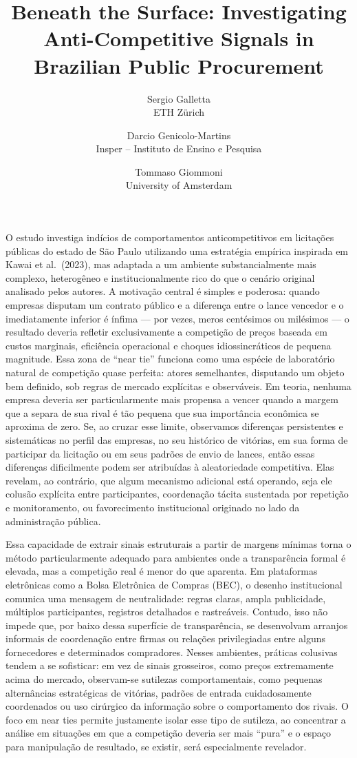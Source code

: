 \documentclass[12pt,a4paper]{article}
\title{Beneath the Surface: Investigating Anti-Competitive Signals in Brazilian Public Procurement}
\author{
  Sergio Galletta\\
  \small ETH Z\"urich
  \and
  Darcio Genicolo-Martins\\
  \small Insper -- Instituto de Ensino e Pesquisa
  \and
  Tommaso Giommoni\\
  \small University of Amsterdam
}
\date{}
\begin{document}
\maketitle

O estudo investiga indícios de comportamentos anticompetitivos em licitações públicas do estado de São Paulo utilizando uma estratégia empírica inspirada em Kawai et al.\ (2023), mas adaptada a um ambiente substancialmente mais complexo, heterogêneo e institucionalmente rico do que o cenário original analisado pelos autores. A motivação central é simples e poderosa: quando empresas disputam um contrato público e a diferença entre o lance vencedor e o imediatamente inferior é ínfima — por vezes, meros centésimos ou milésimos — o resultado deveria refletir exclusivamente a competição de preços baseada em custos marginais, eficiência operacional e choques idiossincráticos de pequena magnitude. Essa zona de ``near tie'' funciona como uma espécie de laboratório natural de competição quase perfeita: atores semelhantes, disputando um objeto bem definido, sob regras de mercado explícitas e observáveis. Em teoria, nenhuma empresa deveria ser particularmente mais propensa a vencer quando a margem que a separa de sua rival é tão pequena que sua importância econômica se aproxima de zero. Se, ao cruzar esse limite, observamos diferenças persistentes e sistemáticas no perfil das empresas, no seu histórico de vitórias, em sua forma de participar da licitação ou em seus padrões de envio de lances, então essas diferenças dificilmente podem ser atribuídas à aleatoriedade competitiva. Elas revelam, ao contrário, que algum mecanismo adicional está operando, seja ele colusão explícita entre participantes, coordenação tácita sustentada por repetição e monitoramento, ou favorecimento institucional originado no lado da administração pública.

Essa capacidade de extrair sinais estruturais a partir de margens mínimas torna o método particularmente adequado para ambientes onde a transparência formal é elevada, mas a competição real é menor do que aparenta. Em plataformas eletrônicas como a Bolsa Eletrônica de Compras (BEC), o desenho institucional comunica uma mensagem de neutralidade: regras claras, ampla publicidade, múltiplos participantes, registros detalhados e rastreáveis. Contudo, isso não impede que, por baixo dessa superfície de transparência, se desenvolvam arranjos informais de coordenação entre firmas ou relações privilegiadas entre alguns fornecedores e determinados compradores. Nesses ambientes, práticas colusivas tendem a se sofisticar: em vez de sinais grosseiros, como preços extremamente acima do mercado, observam-se sutilezas comportamentais, como pequenas alternâncias estratégicas de vitórias, padrões de entrada cuidadosamente coordenados ou uso cirúrgico da informação sobre o comportamento dos rivais. O foco em near ties permite justamente isolar esse tipo de sutileza, ao concentrar a análise em situações em que a competição deveria ser mais ``pura'' e o espaço para manipulação de resultado, se existir, será especialmente revelador.
\end{document}
